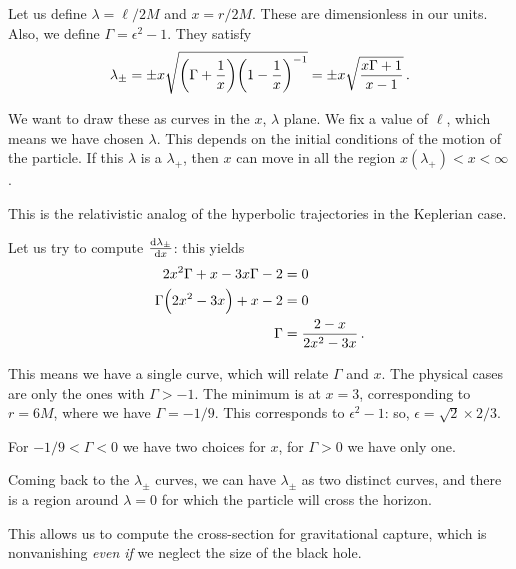 \documentclass[main.tex]{subfiles}
\begin{document}
Let us define \(\lambda = \ell / 2M\) and \(x = r / 2M\). These are dimensionless in our units. Also, we define \(\Gamma = \epsilon^2- 1\). They satisfy 
%
\begin{align}
\lambda_{\pm} 
= \pm x \sqrt{\qty(\Gamma + \frac{1}{x}) \qty(1 - \frac{1}{x})^{-1}}
= \pm x \sqrt{\frac{x\Gamma + 1}{x-1}}
\,.
\end{align}

We want to draw these as curves in the  \(x\), \(\lambda \) plane. 
We fix a value of \(\ell\), which means we have chosen \(\lambda \). This depends on the initial conditions of the motion of the particle. 
If this \(\lambda \) is a \(\lambda _+\), then \(x\) can move in all the region \(x(\lambda _+)  < x < \infty \).

This is the relativistic analog of the hyperbolic trajectories in the Keplerian case. 

Let us try to compute \(\dv{\lambda_{\pm}}{x}\): this yields 
%
\begin{align}
2 x^2 \Gamma + x - 3 x \Gamma - 2 &= 0 \\
\Gamma \qty(2 x^2 - 3x) + x-2 &= 0  \\
\Gamma &= \frac{2-x}{2 x^2 - 3x}
\,.
\end{align}

This means we have a single curve, which will relate \(\Gamma \) and \(x\). 
The physical cases are only the ones with \(\Gamma > -1\). 
The minimum is at \(x = 3\), corresponding to \(r = 6M\), where we have \(\Gamma = - 1 /9\). This corresponds to \(\epsilon^2 - 1\): so, \(\epsilon = \sqrt{2} \times 2/3 \).

For \(- 1/9 < \Gamma < 0\) we have two choices for \(x\), for \(\Gamma > 0\) we have only one. 

Coming back to the \(\lambda_{\pm}\) curves, we can have \(\lambda_{\pm}\) as two distinct curves, and there is a region around \(\lambda = 0\) for which the particle will cross the horizon. 

This allows us to compute the cross-section for gravitational capture, which is nonvanishing \emph{even if} we neglect the size of the black hole. 
\end{document}
